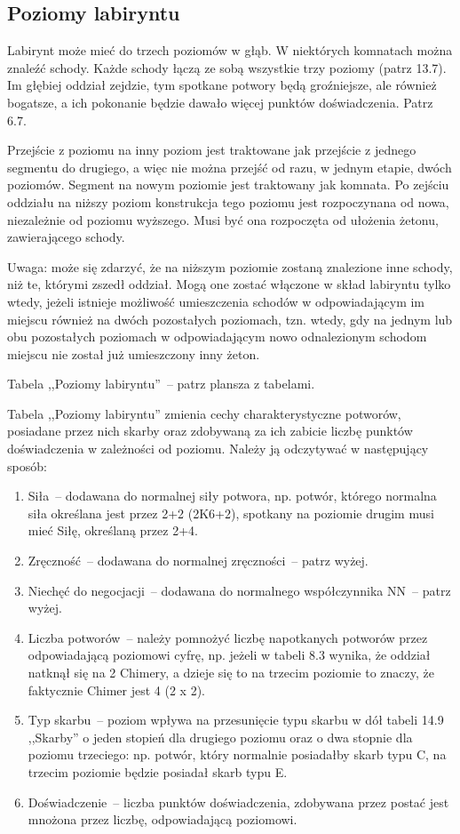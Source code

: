 \subsection{Poziomy labiryntu}
Labirynt może mieć do trzech poziomów w głąb.
W niektórych komnatach można znaleźć schody.
Każde schody łączą ze sobą wszystkie trzy poziomy (patrz 13.7).
Im głębiej oddział zejdzie, tym spotkane potwory będą groźniejsze, ale również bogatsze, a ich pokonanie będzie dawało więcej punktów doświadczenia.
Patrz 6.7.

Przejście z poziomu na inny poziom jest traktowane jak przejście z jednego segmentu do drugiego, a więc nie można przejść od razu, w jednym etapie, dwóch poziomów.
Segment na nowym poziomie jest traktowany jak komnata.
Po zejściu oddziału na niższy poziom konstrukcja tego poziomu jest rozpoczynana od nowa, niezależnie od poziomu wyższego.
Musi być ona rozpoczęta od ułożenia żetonu, zawierającego schody.

Uwaga: może się zdarzyć, że na niższym poziomie zostaną znalezione inne schody, niż te, którymi zszedł oddział.
Mogą one zostać włączone w skład labiryntu tylko wtedy, jeżeli istnieje możliwość umieszczenia schodów w odpowiadającym im miejscu również na dwóch pozostałych poziomach, tzn. wtedy, gdy na jednym lub obu pozostałych poziomach w odpowiadającym nowo odnalezionym schodom miejscu nie został już umieszczony inny żeton.

Tabela ,,Poziomy labiryntu''~-- patrz plansza z tabelami.

Tabela ,,Poziomy labiryntu'' zmienia cechy charakterystyczne potworów, posiadane przez nich skarby oraz zdobywaną za ich zabicie liczbę punktów doświadczenia w zależności od poziomu.
Należy ją odczytywać w następujący sposób:

\begin{enumerate}
    \item
        Siła~-- dodawana do normalnej siły potwora, np. potwór, którego normalna siła określana jest przez 2+2 (2K6+2), spotkany na poziomie drugim musi mieć Siłę, określaną przez 2+4.
    \item
        Zręczność~-- dodawana do normalnej zręczności~-- patrz wyżej.
    \item
        Niechęć do negocjacji~-- dodawana do normalnego współczynnika NN~-- patrz wyżej.
    \item
        Liczba potworów~-- należy pomnożyć liczbę napotkanych potworów przez odpowiadającą poziomowi cyfrę, np. jeżeli w tabeli 8.3 wynika, że oddział natknął się na 2 Chimery, a dzieje się to na trzecim poziomie to znaczy, że faktycznie Chimer jest 4 (2 x 2).
    \item
        Typ skarbu~-- poziom wpływa na przesunięcie typu skarbu w dół tabeli 14.9 ,,Skarby'' o jeden stopień dla drugiego poziomu oraz o dwa stopnie dla poziomu trzeciego: np. potwór, który normalnie posiadałby skarb typu C, na trzecim poziomie będzie posiadał skarb typu E.
    \item
        Doświadczenie~-- liczba punktów doświadczenia, zdobywana przez postać jest mnożona przez liczbę, odpowiadającą poziomowi.
\end{enumerate}

